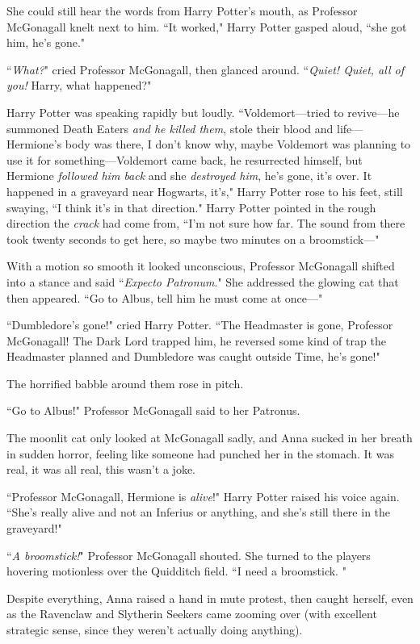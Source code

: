 She could still hear the words from Harry Potter's mouth, as Professor McGonagall knelt next to him. ``It worked," Harry Potter gasped aloud, ``she got him, he's gone."

``\emph{What?}" cried Professor McGonagall, then glanced around. ``\emph{Quiet! Quiet, all of you!} Harry, what happened?"

Harry Potter was speaking rapidly but loudly. ``Voldemort—tried to revive—he summoned Death Eaters \emph{and he killed them}, stole their blood and life—Hermione's body was there, I don't know why, maybe Voldemort was planning to use it for something—Voldemort came back, he resurrected himself, but Hermione \emph{followed him back} and she \emph{destroyed him}, he's gone, it's over. It happened in a graveyard near Hogwarts, it's," Harry Potter rose to his feet, still swaying, ``I think it's in that direction." Harry Potter pointed in the rough direction the \emph{crack} had come from, ``I'm not sure how far. The sound from there took twenty seconds to get here, so maybe two minutes on a broomstick—"

With a motion so smooth it looked unconscious, Professor McGonagall shifted into a stance and said ``\emph{Expecto Patronum}." She addressed the glowing cat that then appeared. ``Go to Albus, tell him he must come at once—"

``Dumbledore's gone!" cried Harry Potter. ``The Headmaster is gone, Professor McGonagall! The Dark Lord trapped him, he reversed some kind of trap the Headmaster planned and Dumbledore was caught outside Time, he's gone!"

The horrified babble around them rose in pitch.

``Go to Albus!" Professor McGonagall said to her Patronus.

The moonlit cat only looked at McGonagall sadly, and Anna sucked in her breath in sudden horror, feeling like someone had punched her in the stomach. It was real, it was all real, this wasn't a joke.

``Professor McGonagall, Hermione is \emph{alive}!" Harry Potter raised his voice again. ``She's really alive and not an Inferius or anything, and she's still there in the graveyard!"

``\emph{A broomstick!}" Professor McGonagall shouted. She turned to the players hovering motionless over the Quidditch field. ``I need a broomstick. "

Despite everything, Anna raised a hand in mute protest, then caught herself, even as the Ravenclaw and Slytherin Seekers came zooming over (with excellent strategic sense, since they weren't actually doing anything).


